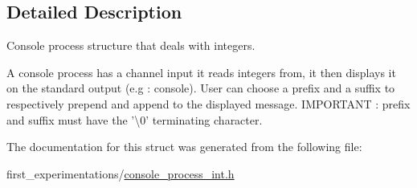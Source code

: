 \subsection{Detailed Description}
Console process structure that deals with integers. 

A console process has a channel input it reads integers from, it then displays it on the standard output (e.\-g \-: console). User can choose a prefix and a suffix to respectively prepend and append to the displayed message. I\-M\-P\-O\-R\-T\-A\-N\-T \-: prefix and suffix must have the '\textbackslash{}0' terminating character. 

The documentation for this struct was generated from the following file\-:\begin{DoxyCompactItemize}
\item 
first\-\_\-experimentations/\hyperlink{console__process__int_8h}{console\-\_\-process\-\_\-int.\-h}\end{DoxyCompactItemize}
